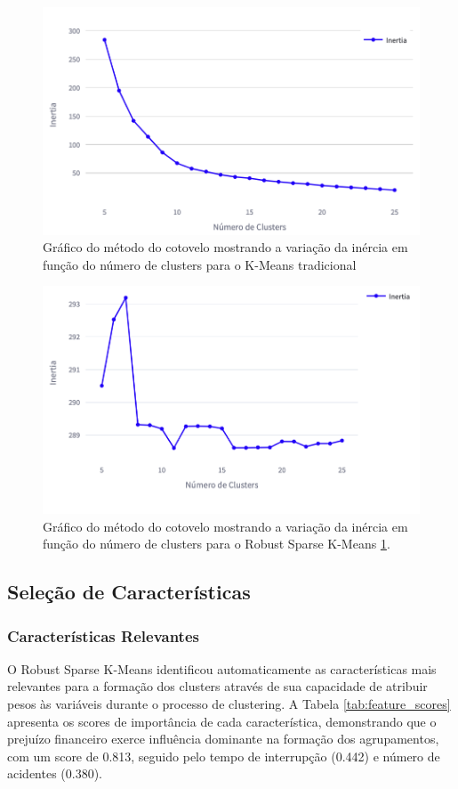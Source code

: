 \documentclass[conference]{IEEEtran}
\begin{document}
\begin{figure}[!htb]
    \centering
    \includegraphics[width=0.9\linewidth]{elbow-plot-kmeans.png}
    \caption{Gráfico do método do cotovelo mostrando a variação da inércia em função do número de clusters para o K-Means tradicional}
    \label{fig:elbow-plot-kmeans}
\end{figure}

\begin{figure}[!htb]
    \centering
    \includegraphics[width=0.8\linewidth]{elbow-plot-sparse.png}
    \caption{Gráfico do método do cotovelo mostrando a variação da inércia em função do número de clusters para o Robust Sparse K-Means
    \ref{fig:elbow-plot-kmeans}.}
    \label{fig:elbow-plot-sparse-kmeans}
\end{figure}


\subsection{Seleção de Características}

\subsubsection{Características Relevantes}
O Robust Sparse K-Means identificou automaticamente as características mais relevantes para a formação dos clusters através de sua capacidade de atribuir pesos às variáveis durante o processo de clustering. A Tabela \ref{tab:feature_scores} apresenta os scores de importância de cada característica, demonstrando que o prejuízo financeiro exerce influência dominante na formação dos agrupamentos, com um score de 0.813, seguido pelo tempo de interrupção (0.442) e número de acidentes (0.380).
\end{document}
